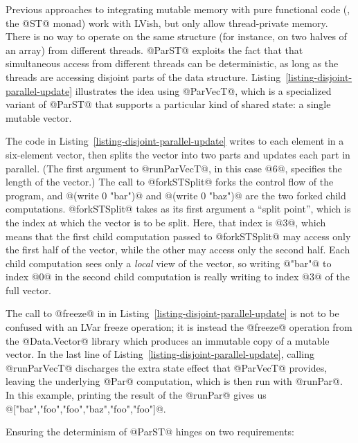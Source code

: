 Previous approaches to integrating mutable memory with pure functional
code (\ie, the @ST@ monad) work with LVish, but only allow
thread-private memory.  There is no way to operate on the same
structure (for instance, on two halves of an array) from different
threads.  @ParST@ exploits the fact that that simultaneous access from
different threads can be deterministic, as long as the threads are
accessing disjoint parts of the data structure.
Listing~\ref{listing-disjoint-parallel-update} illustrates the idea
using @ParVecT@, which is a specialized variant of @ParST@ that
supports a particular kind of shared state: a single mutable vector.

\singlespacing 
\doublespacing

The code in Listing~\ref{listing-disjoint-parallel-update} writes to
each element in a six-element vector, then splits the vector into two
parts and updates each part in parallel.  (The first argument to
@runParVecT@, in this case @6@, specifies the length of the vector.)
The call to @forkSTSplit@ forks the control flow of the program, and
@(write 0 "bar")@ and @(write 0 "baz")@ are the two forked child
computations.  @forkSTSplit@ takes as its first argument a ``split
point'', which is the index at which the vector is to be split.  Here,
that index is @3@, which means that the first child computation passed
to @forkSTSplit@ may access only the first half of the vector, while
the other may access only the second half.  Each child computation
sees only a \emph{local} view of the vector, so writing @"bar"@ to
index @0@ in the second child computation is really writing to index
@3@ of the full vector.

The call to @freeze@ in in
Listing~\ref{listing-disjoint-parallel-update} is not to be confused
with an LVar freeze operation; it is instead the @freeze@ operation
from the @Data.Vector@ library which produces an immutable copy of a
mutable vector.  In the last line of
Listing~\ref{listing-disjoint-parallel-update}, calling @runParVecT@
discharges the extra state effect that @ParVecT@ provides, leaving the
underlying @Par@ computation, which is then run with @runPar@.  In
this example, printing the result of the @runPar@ gives us
@["bar","foo","foo","baz","foo","foo"]@.

Ensuring the determinism of @ParST@ hinges on two requirements:

